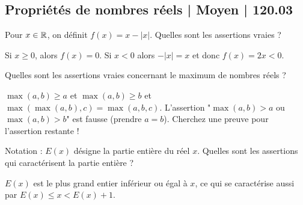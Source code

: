 \subsection{Propriétés de nombres réels | Moyen | 120.03}

\begin{question}
Pour $x\in\mathbb{R}$, on définit $f(x)= x - |x|$.
Quelles sont les assertions vraies ?
\begin{answers}

    

  
\end{answers}
\begin{explanations}
Si $x \ge 0$, alors $f(x)=0$. Si $x<0$ alors $-|x|=x$ et donc $f(x)=2x<0$.
\end{explanations}
\end{question}


\begin{question}
Quelles sont les assertions vraies concernant le maximum de nombres réels ?
\begin{answers}



\end{answers}
\begin{explanations}
$\max(a,b) \ge a$ et $\max(a,b) \ge b$ et $\max( \max(a,b), c ) = \max(a,b,c)$. L'assertion "$\max(a,b) > a$ ou $\max(a,b) > b$" est fausse (prendre $a=b$). Cherchez une preuve pour l'assertion restante !
\end{explanations}
\end{question}




\begin{question}
Notation : $E(x)$ désigne la partie entière du réel $x$.
Quelles sont les assertions qui caractérisent la partie entière ?
\begin{answers}



\end{answers}
\begin{explanations}
$E(x)$ est le plus grand entier inférieur ou égal à $x$, ce qui se caractérise aussi par $E(x) \le x < E(x)+1$.
\end{explanations}
\end{question}


